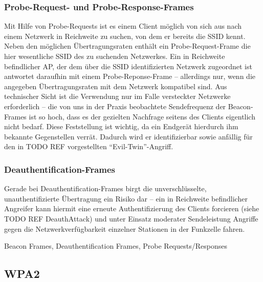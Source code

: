 \subsubsection{Probe-Request- und Probe-Response-Frames}
Mit Hilfe von Probe-Requests ist es einem Client möglich von sich aus nach einem Netzwerk in Reichweite zu suchen, von dem er bereits die SSID kennt. Neben den möglichen Übertragungsraten enthält ein Probe-Request-Frame die hier wesentliche SSID des zu suchenden Netzwerkes. Ein in Reichweite befindlicher AP, der dem über die SSID identifizierten Netzwerk zugeordnet ist antwortet daraufhin mit einem Probe-Reponse-Frame -- allerdings nur, wenn die angegeben Übertragungsraten mit dem Netzwerk kompatibel sind. Aus technischer Sicht ist die Verwendung nur im Falle versteckter Netzwerke erforderlich -- die von uns in der Praxis beobachtete Sendefrequenz der Beacon-Frames ist so hoch, dass es der gezielten Nachfrage seitens des Clients eigentlich nicht bedarf. Diese Feststellung ist wichtig, da ein Endgerät hierdurch ihm bekannte Gegenstellen verrät. Dadurch wird er identifizierbar sowie anfällig für den in TODO REF vorgestellten \enquote{Evil-Twin}-Angriff.

\subsubsection{Deauthentification-Frames}

Gerade bei Deauthentification-Frames birgt die unverschlüsselte, unauthentifizierte Übertragung ein Risiko dar -- ein in Reichweite befindlicher Angreifer kann hiermit eine erneute Authentifizierung des Clients forcieren (siehe TODO REF DeauthAttack) und unter Einsatz moderater Sendeleistung Angriffe gegen die Netzwerkverfügbarkeit einzelner Stationen in der Funkzelle fahren.

Beacon Frames, Deauthentification Frames, Probe Requests/Responses

\subsection{WPA2}